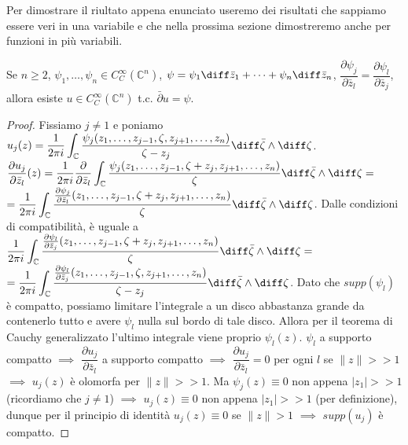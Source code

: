 Per dimostrare il riultato appena enunciato useremo dei risultati che sappiamo essere veri in una variabile e che nella prossima sezione dimostreremo anche per funzioni in più variabili.

\begin{thm} \label{equazionaccia}
  Se $n \ge 2$, $\psi_1, \dots, \psi_n \in C^\infty_C(\mathbb{C}^n)$, $\psi=\psi_1\diff \bar{z}_1+\dots+\psi_n\diff \bar{z}_n$, $\dfrac{\partial \psi_j}{\partial \bar{z}_l}=\dfrac{\partial \psi_l}{\partial \bar{z}_j}$, allora esiste $u \in C^{\infty}_C(\mathbb{C}^n)$ t.c. $\bar{\partial}u=\psi$.
\end{thm}

\begin{proof}
  Fissiamo $j\not=1$ e poniamo $\displaystyle u_j(z)=\frac{1}{2\pi i}\int_{\mathbb{C}} \dfrac{\psi_j(z_1, \dots, z_{j-1}, \zeta, z_{j+1}, \dots, z_n)}{\zeta-z_j}\diff\bar{\zeta}\wedge\diff\zeta$.
  $\displaystyle \frac{\partial u_j}{\partial \bar{z}_l}(z)=\frac{1}{2\pi i}\frac{\partial}{\partial\bar{z}_l}\int_{\mathbb{C}} \dfrac{\psi_j(z_1, \dots, z_{j-1}, \zeta+z_j, z_{j+1}, \dots, z_n)}{\zeta}\diff\bar{\zeta}\wedge\diff\zeta=$\\
  $\displaystyle =\frac{1}{2\pi i}\int_{\mathbb{C}} \dfrac{\frac{\partial\psi_j}{\partial\bar{z}_l}(z_1, \dots, z_{j-1}, \zeta+z_j, z_{j+1}, \dots, z_n)}{\zeta}\diff\bar{\zeta}\wedge\diff\zeta$.
  Dalle condizioni di compatibilità, è uguale a $\displaystyle \frac{1}{2\pi i}\int_{\mathbb{C}} \dfrac{\frac{\partial\psi_l}{\partial\bar{z}_j}(z_1, \dots, z_{j-1}, \zeta+z_j, z_{j+1}, \dots, z_n)}{\zeta}\diff\bar{\zeta}\wedge\diff\zeta=$ \\
  $\displaystyle =\frac{1}{2\pi i}\int_{\mathbb{C}} \dfrac{\frac{\partial\psi_l}{\partial\bar{z}_j}(z_1, \dots, z_{j-1}, \zeta, z_{j+1}, \dots, z_n)}{\zeta-z_j}\diff\bar{\zeta}\wedge\diff\zeta$.
  Dato che $supp(\psi_l)$ è compatto, possiamo limitare l'integrale a un disco abbastanza grande da contenerlo tutto e avere $\psi_l$ nulla sul bordo di tale disco. Allora per il teorema di Cauchy generalizzato l'ultimo integrale viene proprio $\psi_l(z)$. $\psi_l$ a supporto compatto $\implies$ $\dfrac{\partial u_j}{\partial \bar{z}_l}$ a supporto compatto $\implies$ $\dfrac{\partial u_j}{\partial \bar{z}_l}=0$ per ogni $l$ se $\|z\|>>1$ $\implies$ $u_j(z)$ è olomorfa per $\|z\|>>1$.
  Ma $\psi_j(z)\equiv 0$ non appena $|z_1|>>1$ (ricordiamo che $j\not=1$) $\implies$ $u_j(z) \equiv 0$ non appena $|z_1|>>1$ (per definizione), dunque per il principio di identità $u_j(z) \equiv 0$ se $\|z\|>1$ $\implies$ $supp(u_j)$ è compatto.
\end{proof}

